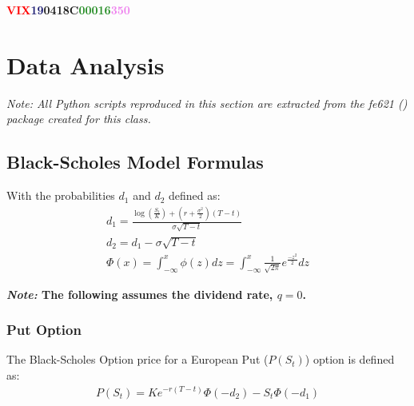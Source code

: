 \documentclass[10pt]{article}
\newcommand*\lstinputpath[1]{\lstset{inputpath=#1}} %
\begin{document}
        \begin{center}
            \textbf{\textcolor{red}{VIX}\textcolor{MidnightBlue}{19}\textcolor{Bittersweet}{04}\textcolor{YellowOrange}{18}\textcolor{RoyalPurple}{C}\textcolor{ForestGreen}{00016}\textcolor{violet}{350}}
        \end{center}



\newpage

\lstinputpath{..}

\section{Data Analysis}

    \begin{center}
        \textit{Note: All Python scripts reproduced in this section are extracted from the {\normalfont fe621 (\cite{Weerawarana2019}}) package created for this class.}
    \end{center}

    \subsection{Black-Scholes Model Formulas}

    With the probabilities $d_1$ and $d_2$ defined as:
    \begin{gather*}
        d_1 = \frac{\log \left( \frac{S_t}{K} \right) + \left( r + \frac{\sigma^2}{2} \right) (T-t)}{\sigma \sqrt{T-t}} \\
        d_2 = d_1 - \sigma \sqrt{T-t} \\
        \Phi(x) = \int_{-\infty}^{x} \phi(z) dz = \int_{-\infty}^{x} \frac{1}{\sqrt{2\pi}} e^{\frac{-z^2}{2}} dz
    \end{gather*}

    

    \begin{center}
        \textbf{\textit{Note:} The following assumes the dividend rate, $q = 0$.}
    \end{center}

        \subsubsection{Put Option}

        The Black-Scholes Option price for a European Put ($P(S_t)$) option is defined as:
        \begin{gather*}
            P(S_t) = K e^{-r(T-t)} \Phi(-d_2) - S_t \Phi(-d_1)
        \end{gather*}
\end{document}
